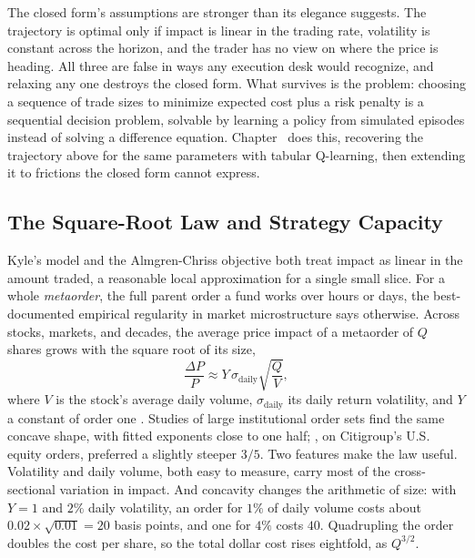 \documentclass[../ai_in_finance]{subfiles}
\begin{document}
The closed form's assumptions are stronger than its elegance suggests. The trajectory is optimal only if impact is linear in the trading rate, volatility is constant across the horizon, and the trader has no view on where the price is heading. All three are false in ways any execution desk would recognize, and relaxing any one destroys the closed form. What survives is the problem: choosing a sequence of trade sizes to minimize expected cost plus a risk penalty is a sequential decision problem, solvable by learning a policy from simulated episodes instead of solving a difference equation. Chapter~ does this, recovering the trajectory above for the same parameters with tabular Q-learning, then extending it to frictions the closed form cannot express.

\subsection{The Square-Root Law and Strategy Capacity}
\label{sec:square-root-impact}

Kyle's model and the Almgren-Chriss objective both treat impact as linear in the amount traded, a reasonable local approximation for a single small slice. For a whole \emph{metaorder}, the full parent order a fund works over hours or days, the best-documented empirical regularity in market microstructure says otherwise. Across stocks, markets, and decades, the average price impact of a metaorder of $Q$ shares grows with the square root of its size,
\begin{equation}
\frac{\Delta P}{P} \approx Y\,\sigma_{\text{daily}}\sqrt{\frac{Q}{V}},
\label{eq:algotrading-square-root}
\end{equation}
where $V$ is the stock's average daily volume, $\sigma_{\text{daily}}$ its daily return volatility, and $Y$ a constant of order one \parencite{toth2011anomalous}. Studies of large institutional order sets find the same concave shape, with fitted exponents close to one half; \textcite{almgren2005direct}, on Citigroup's U.S. equity orders, preferred a slightly steeper $3/5$. Two features make the law useful. Volatility and daily volume, both easy to measure, carry most of the cross-sectional variation in impact. And concavity changes the arithmetic of size: with $Y=1$ and $2\%$ daily volatility, an order for $1\%$ of daily volume costs about $0.02\times\sqrt{0.01}=20$ basis points, and one for $4\%$ costs $40$. Quadrupling the order doubles the cost per share, so the total dollar cost rises eightfold, as $Q^{3/2}$.
\end{document}
